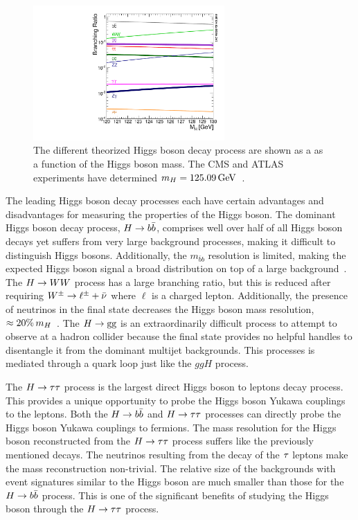 \begin{figure}[htbp]
\centering
     \includegraphics[width=0.65\textwidth]{phenomenology_of_processes/plots/SMHiggsBR_YR4-square.pdf}
     \caption{
The different theorized Higgs boson decay process are shown as a 
as a function of the Higgs boson mass.
The CMS and ATLAS experiments have determined $m_{H} = 125.09\,\mathrm{GeV}$~\cite{Aad:2015zhl}.
     }
     \label{fig:higgs_decay}
\end{figure}

The leading Higgs boson decay processes each have certain advantages and disadvantages
for measuring the properties of the Higgs boson. The dominant Higgs boson decay 
process, $H\to b\bar{b}$, comprises well over half of all Higgs boson decays yet suffers
from very large background processes, making it difficult to distinguish Higgs bosons.
Additionally, the $m_{\bar{b}b}$ resolution is limited, making the expected Higgs boson
signal a broad distribution on top of a large background~\cite{PDG}.
The $H\to WW$ process has a large branching ratio, but this is reduced after requiring
$W^{\pm}\to\ell^{\pm} + \bar{\nu}$ where $\ell$ is a charged lepton. Additionally, the presence of neutrinos
in the final state decreases the Higgs boson mass resolution, $\approx 20\% \, m_{H}$~\cite{PDG}.
The $H\to\text{g}\text{g}$ is an extraordinarily difficult process to attempt to observe at a
hadron collider because the final state provides no helpful handles to disentangle it from
the dominant multijet backgrounds. This processes is mediated through a quark loop just
like the $ggH$ process.

The $H\to\tau\tau$ process is the largest direct Higgs boson to leptons decay process.
This provides a unique opportunity to probe the Higgs boson Yukawa couplings to the leptons.
Both the $H\to b\bar{b}$ and $H\to\tau\tau$ processes can directly probe the Higgs boson
Yukawa couplings to fermions. 
The mass resolution for the Higgs boson reconstructed from the $H\to\tau\tau$ process suffers like
the previously mentioned decays. The neutrinos resulting from the decay of the $\tau$
leptons make the mass reconstruction non-trivial.
The relative size of the backgrounds with event signatures similar to the Higgs boson
are much smaller than those for the $H\to b\bar{b}$ process. This is one
of the significant benefits of studying the Higgs boson through the $H\to\tau\tau$ process.

